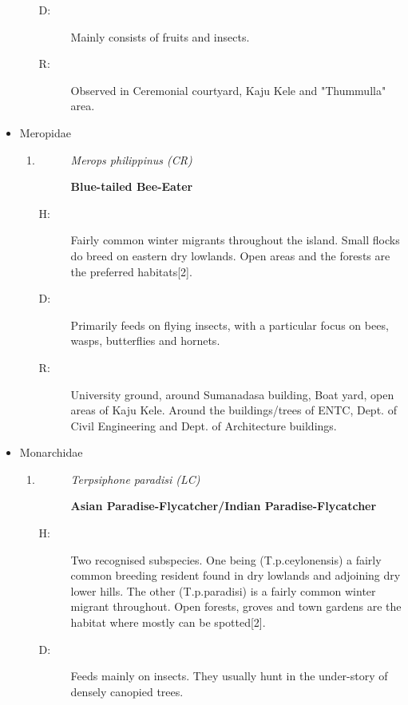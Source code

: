 \begin{itemize}
\begin{enumerate}
\begin{description}
\item[D: ]%
Mainly consists of fruits and insects.%
\item[R: ]%
Observed in Ceremonial courtyard, Kaju Kele and "Thummulla" area.%
\end{description}%
\end{enumerate}%
\item%
Meropidae%
\begin{enumerate}%
\item%
\begin{description}%
\item[]%
\textit{Merops philippinus (CR)}%
\item[]%
\textbf{Blue{-}tailed Bee{-}Eater}%
\end{description}%
\begin{description}%
\item[H: ]%
Fairly common winter migrants throughout the island. Small flocks do breed on eastern dry lowlands. Open areas and the forests are the preferred habitats{[}2{]}.%
\item[D: ]%
Primarily feeds on flying insects, with a particular focus on bees, wasps, butterflies and hornets. %
\item[R: ]%
University ground, around Sumanadasa building, Boat yard, open areas of Kaju Kele. Around the buildings/trees of  ENTC,  Dept. of Civil Engineering and Dept. of Architecture buildings.%
\end{description}%
\end{enumerate}%
\item%
Monarchidae%
\begin{enumerate}%
\item%
\begin{description}%
\item[]%
\textit{Terpsiphone paradisi (LC)}%
\item[]%
\textbf{Asian Paradise{-}Flycatcher/Indian Paradise{-}Flycatcher}%
\end{description}%
\begin{description}%
\item[H: ]%
Two recognised subspecies. One being (T.p.ceylonensis) a fairly common breeding resident found in dry lowlands and adjoining dry lower hills. The other (T.p.paradisi) is a fairly common winter migrant throughout. Open forests, groves and town gardens are the habitat where mostly can be spotted{[}2{]}.%
\item[D: ]%
Feeds mainly on insects.  They usually hunt in the under-story of densely canopied trees.%

\end{description}
\end{enumerate}
\end{itemize}
